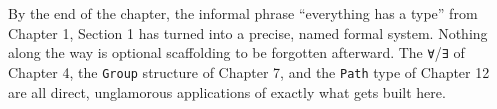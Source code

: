 By the end of the chapter, the informal phrase ``everything has a type'' from Chapter 1, Section 1 has turned into a precise, named formal system. Nothing along the way is optional scaffolding to be forgotten afterward. The \texttt{∀}/\texttt{∃} of Chapter 4, the \texttt{Group} structure of Chapter 7, and the \texttt{Path} type of Chapter 12 are all direct, unglamorous applications of exactly what gets built here.





